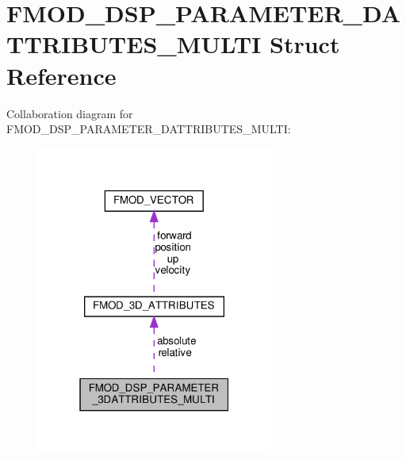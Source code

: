 \hypertarget{structFMOD__DSP__PARAMETER__3DATTRIBUTES__MULTI}{}\section{F\+M\+O\+D\+\_\+\+D\+S\+P\+\_\+\+P\+A\+R\+A\+M\+E\+T\+E\+R\+\_\+D\+A\+T\+T\+R\+I\+B\+U\+T\+E\+S\+\_\+\+M\+U\+L\+TI Struct Reference}
\label{structFMOD__DSP__PARAMETER__3DATTRIBUTES__MULTI}


Collaboration diagram for F\+M\+O\+D\+\_\+\+D\+S\+P\+\_\+\+P\+A\+R\+A\+M\+E\+T\+E\+R\+\_\+D\+A\+T\+T\+R\+I\+B\+U\+T\+E\+S\+\_\+\+M\+U\+L\+TI\+:
\nopagebreak
\begin{figure}[H]
\begin{center}
\leavevmode
\includegraphics[width=220pt]{structFMOD__DSP__PARAMETER__3DATTRIBUTES__MULTI__coll__graph}
\end{center}
\end{figure}
